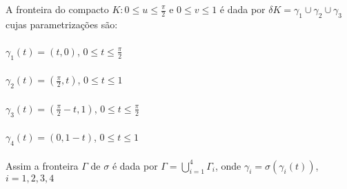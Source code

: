 \documentclass[11pt,a4paper]{article}
\begin{document}
\begin{enumerate}
{{		                \item A fronteira do compacto $K: 0\leq u\leq\frac{\pi}{2}$ e $0\leq v \leq 1$  é dada por $\delta K = \gamma_{1} \cup \gamma_{2} \cup \gamma_{3}$ cujas parametrizações são: \\\\
		                $\gamma_{1}(t) = (t,0)$, $0 \leq t \leq \frac{\pi}{2}$\\\\
		                $\gamma_{2}(t) = (\frac{\pi}{2},t)$, $0 \leq t \leq 1$\\\\
		                $\gamma_{3}(t) = (\frac{\pi}{2}-t,1)$, $0 \leq t \leq \frac{\pi}{2}$\\\\
		                $\gamma_{4}(t) = (0,1-t)$, $0 \leq t \leq 1$\\\\
		                Assim a fronteira $\Gamma$ de $\sigma$ é dada por $\Gamma = \bigcup_{i=1}^{4}\Gamma_{i}$, onde $\gamma_{i} = \sigma(\gamma_{i}(t))$, $i = 1,2,3,4$\\\\
		                
}}
\end{enumerate}
\end{document}
